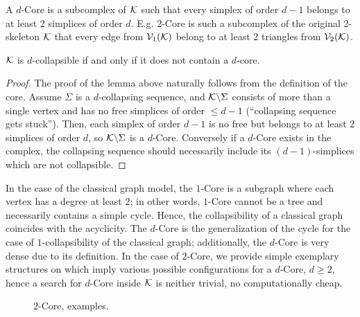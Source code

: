 \begin{definition}[\(d\)-Core]
      A \(d\)-Core is a subcomplex of \( \mathcal{K} \) such that every simplex of order \( d - 1\) belongs to at least \( 2 \) simplices of order \( d \). E.g. \(2\)-Core is such a subcomplex of the original 2-skeleton \( \mathcal{K} \) that every edge from \( \mathcal{V}_{1}(\mathcal{K}) \) belong to at least \(2\) triangles from \( \mathcal{V}_{2}(\mathcal{K}) \).
\end{definition}

\begin{lemma}
      \( \mathcal{K} \) is \(d\)-collapsible if and only if it does not contain a \( d\)-core.
\end{lemma}
\begin{proof}
      The proof of the lemma above naturally follows from the definition of the core. Assume \( \Sigma \) is a \(d\)-collapsing sequence, and \( \mathcal{K} \backslash \Sigma \) consists of more than a single vertex and has no free simplices of order \( \le d-1\) (``collapsing sequence gets stuck''). Then, each simplex of order \( d-1 \) is no free but belongs to at least \(2\) simplices of order \(d\), so \( \mathcal{K} \backslash \Sigma \) is a \( d \)-Core. Conversely if a \(d\)-Core exists in the complex, the collapsing sequence should necessarily include its \((d-1)\)-simplices which are not collapsible. %
\end{proof}

In the case of the classical graph model, the \( 1 \)-Core is a subgraph where each vertex has a degree at least \( 2 \); in other words, \( 1 \)-Core cannot be a tree and necessarily contains a simple cycle. Hence, the collapsibility of a classical graph coincides with the acyclicity. The \(d\)-Core is the generalization of the cycle for the case of \(1\)-collapsibility of the classical graph; additionally, the \(d\)-Core is very dense due to its definition. In the case of \(2\)-Core, we provide simple exemplary structures on  which imply various possible configurations for a  \(d\)-Core, \( d \ge 2 \), hence a search for \(d\)-Core inside \( \mathcal{K} \) is neither trivial, no computationally cheap.

\begin{figure}[htbp]
      \centering
      
      \caption{ \(2\)-Core, examples. \label{fig:2-core} }
\end{figure}

